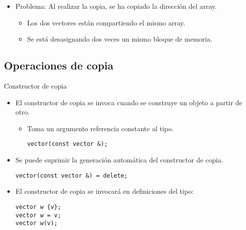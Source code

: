 \begin{frame}
\begin{itemize}
  \item \alert{Problema}: Al realizar la copia, se ha copiado la dirección del array.
    \begin{itemize}
      \item Los dos vectores están compartiendo el mismo array.
      \item Se está desasignando dos veces un mismo bloque de memoria.
    \end{itemize}
\end{itemize}
\end{frame}

\subsection{Operaciones de copia}

\begin{frame}[fragile]{Constructor de copia}
\begin{itemize}
  \item El \alert{constructor de copia} se invoca cuando se construye un objeto
        a partir de otro.
    \begin{itemize}
      \item Toma un argumento referencia constante al tipo.
\begin{lstlisting}
vector(const vector &);
\end{lstlisting}
    \end{itemize}
  \item Se puede suprimir la generación automática del constructor de copia.
\begin{lstlisting}
vector(const vector &) = delete;
\end{lstlisting}
  \item El constructor de copia se invocará en definiciones del tipo:
\begin{lstlisting}
vector w {v};
vector w = v;
vector w(v);
\end{lstlisting}
\end{itemize}
\end{frame}


